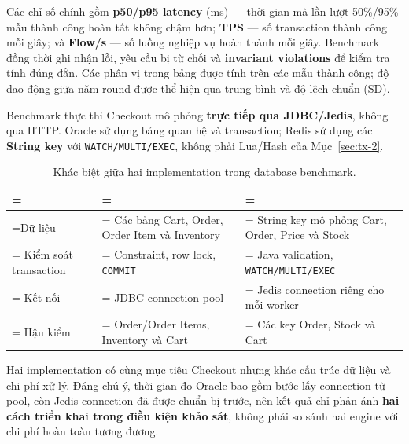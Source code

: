 Các chỉ số chính gồm \textbf{p50/p95 latency} (ms) — thời gian mà lần lượt 50\%/95\% mẫu thành công hoàn tất không chậm hơn; \textbf{TPS} — số transaction thành công mỗi giây; và \textbf{Flow/s} — số luồng nghiệp vụ hoàn thành mỗi giây. Benchmark đồng thời ghi nhận lỗi, yêu cầu bị từ chối và \textbf{invariant violations} để kiểm tra tính đúng đắn. Các phân vị trong bảng được tính trên các mẫu thành công; độ dao động giữa năm round được thể hiện qua trung bình và độ lệch chuẩn (SD).

\label{sec:tx-3-2}
Benchmark thực thi Checkout mô phỏng \textbf{trực tiếp qua JDBC/Jedis}, không qua HTTP. Oracle sử dụng bảng quan hệ và transaction; Redis sử dụng các \textbf{String key} với \texttt{WATCH/\allowbreak{}MULTI/\allowbreak{}EXEC}, không phải Lua/Hash của Mục~\ref{sec:tx-2}.

\begin{table}[!htbp]
\centering
\caption{Khác biệt giữa hai implementation trong database benchmark.}\label{tab:tx-18}
\reporttablesetup
\begin{tabularx}{\linewidth}{|>{\hsize\linewidth=\hsize}L|>{\hsize\linewidth=\hsize}L|>{\hsize\linewidth=\hsize}L|}
\hline
{}
 &  &  \\ \hline
Dữ liệu & Các bảng Cart, Order, Order Item và Inventory & String key mô phỏng Cart, Order, Price và Stock \\ \hline
Kiểm soát transaction & Constraint, row lock, \texttt{COMMIT} & Java validation, \texttt{WATCH/\allowbreak{}MULTI/\allowbreak{}EXEC} \\ \hline
Kết nối & JDBC connection pool & Jedis connection riêng cho mỗi worker \\ \hline
Hậu kiểm & Order/Order Items, Inventory và Cart & Các key Order, Stock và Cart \\ \hline
\end{tabularx}
\end{table}
Hai implementation có cùng mục tiêu Checkout nhưng khác cấu trúc dữ liệu và chi phí xử lý. Đáng chú ý, thời gian đo Oracle bao gồm bước lấy connection từ pool, còn Jedis connection đã được chuẩn bị trước, nên kết quả chỉ phản ánh \textbf{hai cách triển khai trong điều kiện khảo sát}, không phải so sánh hai engine với chi phí hoàn toàn tương đương.

